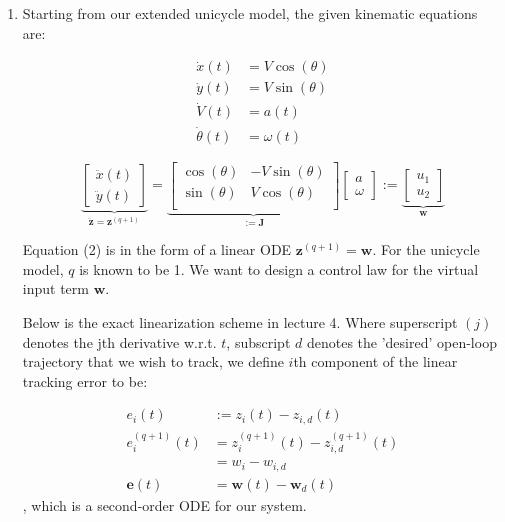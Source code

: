 \documentclass{article}
\begin{document}
	\begin{enumerate}[label=(\roman*)]
	
	\item %
	Starting from our extended unicycle model, the given kinematic equations are:
	
	\begin{equation}
	\begin{aligned}
	\dot{x}(t) &= V\cos(\theta) \\
	\dot{y}(t) &= V\sin(\theta) \\
	\dot{V}(t) &= a(t) \\
	\dot{\theta}(t) &= \omega(t)
	\end{aligned}
	\end{equation}
	
	\begin{equation}
	\underbrace{
		\begin{bmatrix}
		\ddot{x}(t) \\
		\ddot{y}(t)
		\end{bmatrix}
	}_{\ddot{\bm{z}}=\bm{z}^{(q+1)}}
	=
	\underbrace{
		\begin{bmatrix}
		\cos(\theta) & -V\sin(\theta) \\
		\sin(\theta) & V\cos(\theta) \\
		\end{bmatrix}
	}_{:=\bm{J}}
	\begin{bmatrix}
	a \\
	\omega
	\end{bmatrix}
	:=
	\underbrace{
		\begin{bmatrix}
		u_1 \\
		u_2
		\end{bmatrix}
	}_{\bm{w}}
	\end{equation}
	
	Equation (2) is in the form of a linear ODE $\bm{z}^{(q+1)}=\bm{w}$. For the unicycle model, $q$ is known to be 1. We want to design a control law for the virtual input term $\bm{w}$.
	
	Below is the exact linearization scheme in lecture 4. Where superscript $(j)$ denotes the jth derivative w.r.t. $t$, subscript $d$ denotes the 'desired' open-loop trajectory that we wish to track, we define $i$th component of the linear tracking error to be:
	
	\begin{equation}
	\begin{aligned}
	e_i(t) &:=z_i(t) - z_{i,d}(t) \\
	e_i^{(q+1)}(t) &= z^{(q+1)}_i(t) - z^{(q+1)}_{i,d}(t) \\
	               &= w_i - w_{i,d} \\
	\bm{e}(t) &= \bm{w}(t) - \bm{w}_d(t)
	\end{aligned}
	\end{equation}
	, which is a second-order ODE for our system.
	

\end{enumerate}
\end{document}
